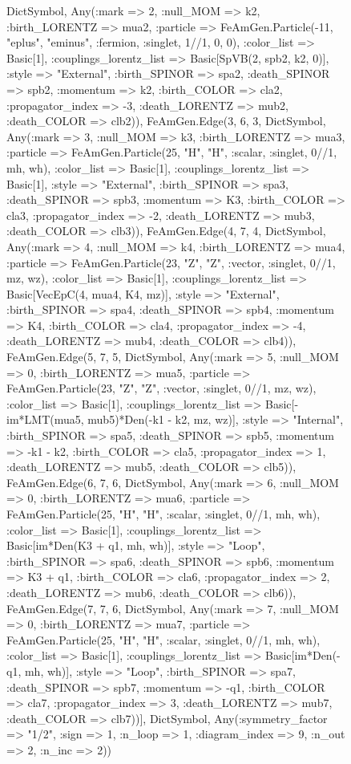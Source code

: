 \documentclass{revtex4}
\begin{document}
\begin{figure}[!htb]
\begin{center}
{Dict{Symbol, Any}(:mark => 2, :null_MOM => k2, :birth_LORENTZ => mua2, :particle => FeAmGen.Particle(-11, "eplus", "eminus", :fermion, :singlet, 1//1, 0, 0), :color_list => Basic[1], :couplings_lorentz_list => Basic[SpVB(2, spb2, k2, 0)], :style => "External", :birth_SPINOR => spa2, :death_SPINOR => spb2, :momentum => k2, :birth_COLOR => cla2, :propagator_index => -3, :death_LORENTZ => mub2, :death_COLOR => clb2)), FeAmGen.Edge(3, 6, 3, Dict{Symbol, Any}(:mark => 3, :null_MOM => k3, :birth_LORENTZ => mua3, :particle => FeAmGen.Particle(25, "H", "H", :scalar, :singlet, 0//1, mh, wh), :color_list => Basic[1], :couplings_lorentz_list => Basic[1], :style => "External", :birth_SPINOR => spa3, :death_SPINOR => spb3, :momentum => K3, :birth_COLOR => cla3, :propagator_index => -2, :death_LORENTZ => mub3, :death_COLOR => clb3)), FeAmGen.Edge(4, 7, 4, Dict{Symbol, Any}(:mark => 4, :null_MOM => k4, :birth_LORENTZ => mua4, :particle => FeAmGen.Particle(23, "Z", "Z", :vector, :singlet, 0//1, mz, wz), :color_list => Basic[1], :couplings_lorentz_list => Basic[VecEpC(4, mua4, K4, mz)], :style => "External", :birth_SPINOR => spa4, :death_SPINOR => spb4, :momentum => K4, :birth_COLOR => cla4, :propagator_index => -4, :death_LORENTZ => mub4, :death_COLOR => clb4)), FeAmGen.Edge(5, 7, 5, Dict{Symbol, Any}(:mark => 5, :null_MOM => 0, :birth_LORENTZ => mua5, :particle => FeAmGen.Particle(23, "Z", "Z", :vector, :singlet, 0//1, mz, wz), :color_list => Basic[1], :couplings_lorentz_list => Basic[-im*LMT(mua5, mub5)*Den(-k1 - k2, mz, wz)], :style => "Internal", :birth_SPINOR => spa5, :death_SPINOR => spb5, :momentum => -k1 - k2, :birth_COLOR => cla5, :propagator_index => 1, :death_LORENTZ => mub5, :death_COLOR => clb5)), FeAmGen.Edge(6, 7, 6, Dict{Symbol, Any}(:mark => 6, :null_MOM => 0, :birth_LORENTZ => mua6, :particle => FeAmGen.Particle(25, "H", "H", :scalar, :singlet, 0//1, mh, wh), :color_list => Basic[1], :couplings_lorentz_list => Basic[im*Den(K3 + q1, mh, wh)], :style => "Loop", :birth_SPINOR => spa6, :death_SPINOR => spb6, :momentum => K3 + q1, :birth_COLOR => cla6, :propagator_index => 2, :death_LORENTZ => mub6, :death_COLOR => clb6)), FeAmGen.Edge(7, 7, 6, Dict{Symbol, Any}(:mark => 7, :null_MOM => 0, :birth_LORENTZ => mua7, :particle => FeAmGen.Particle(25, "H", "H", :scalar, :singlet, 0//1, mh, wh), :color_list => Basic[1], :couplings_lorentz_list => Basic[im*Den(-q1, mh, wh)], :style => "Loop", :birth_SPINOR => spa7, :death_SPINOR => spb7, :momentum => -q1, :birth_COLOR => cla7, :propagator_index => 3, :death_LORENTZ => mub7, :death_COLOR => clb7))], Dict{Symbol, Any}(:symmetry_factor => "1/2", :sign => 1, :n_loop => 1, :diagram_index => 9, :n_out => 2, :n_inc => 2)) 
}
\end{center}
\end{figure}
\end{document}
